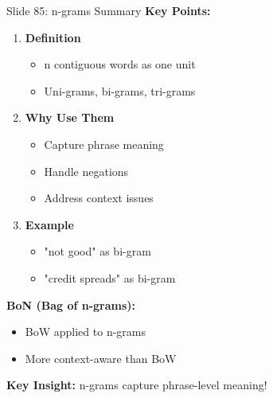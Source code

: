 \documentclass[8pt]{beamer}
\begin{document}
	\begin{frame}{Slide 85: n-grams Summary}
		\fontsize{6.5}{7.5}\selectfont
		\textbf{Key Points:}
		\begin{enumerate}
			\item \textbf{Definition}
			\begin{itemize}
				\item n contiguous words as one unit
				\item Uni-grams, bi-grams, tri-grams
			\end{itemize}
			\item \textbf{Why Use Them}
			\begin{itemize}
				\item Capture phrase meaning
				\item Handle negations
				\item Address context issues
			\end{itemize}
			\item \textbf{Example}
			\begin{itemize}
				\item "not good" as bi-gram
				\item "credit spreads" as bi-gram
			\end{itemize}
		\end{enumerate}
		
		\vspace{0.1cm}
		\textbf{BoN (Bag of n-grams):}
		\begin{itemize}
			\item BoW applied to n-grams
			\item More context-aware than BoW
		\end{itemize}
		
		\textcolor{myblue}{\textbf{Key Insight:}} n-grams capture phrase-level meaning!
	\end{frame}
	
\end{document}
